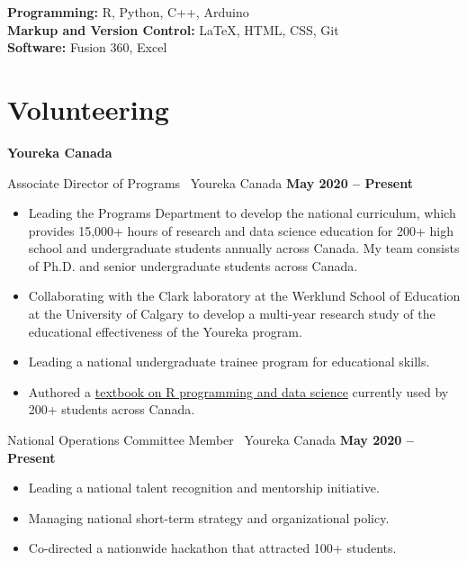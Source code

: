 \documentclass{article}
\begin{document}
\textbf{Programming:} R, Python, C++, Arduino\\
\textbf{Markup and Version Control:} \LaTeX, HTML, CSS, Git\\
\textbf{Software:} Fusion 360, Excel


\section*{\textcolor{my_colour}{Volunteering}}
\vspace{-.25em} \hrulefill \vspace{.75em}

\textbf{Youreka Canada}

Associate Director of Programs \textbar\ Youreka Canada \hfill \textbf{May 2020 -- Present}
\begin{itemize}
    \item Leading the Programs Department to develop the national curriculum, which provides 15,000+ hours of research and data science education for 200+ high school and undergraduate students annually across Canada. My team consists of Ph.D. and senior undergraduate students across Canada.
    \item Collaborating with the Clark laboratory at the Werklund School of Education at the University of Calgary to develop a multi-year research study of the educational effectiveness of the Youreka program.
    \item Leading a national undergraduate trainee program for educational skills.
    \item Authored a \href{https://youreka-textbook.netlify.app/}{textbook on R programming and data science} currently used by 200+ students across Canada.
\end{itemize}

National Operations Committee Member \textbar\ Youreka Canada \hfill \textbf{May 2020 -- Present}
\begin{itemize}
    \item Leading a national talent recognition and mentorship initiative.
    \item Managing national short-term strategy and organizational policy.
    \item Co-directed a nationwide hackathon that attracted 100+ students.
\end{itemize}
\end{document}
